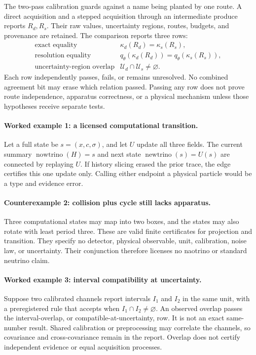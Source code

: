 The two-pass calibration guards against a name being planted by one route.  A direct acquisition and a stepped
acquisition through an intermediate produce reports \(R_d,R_s\).  Their raw values, uncertainty regions, routes,
budgets, and provenance are retained.  The comparison reports three rows:
\[
\begin{array}{ll}
\text{exact equality}&\kappa_d(R_d)=\kappa_s(R_s),\\
\text{resolution equality}&q_\theta(\kappa_d(R_d))=q_\theta(\kappa_s(R_s)),\\
\text{uncertainty-region overlap}&\mathcal U_d\cap\mathcal U_s\ne\varnothing.
\end{array}
\]
Each row independently passes, fails, or remains unresolved.  No combined agreement bit may erase which relation
passed.  Passing any row does not prove route independence, apparatus correctness, or a physical mechanism unless
those hypotheses receive separate tests.

\paragraph{Worked example 1: a licensed computational transition.}
Let a full state be \(s=(x,c,\sigma)\), and let \(U\) update all three fields.  The current summary
\(\operatorname{nowtrino}(H)=s\) and next state \(\operatorname{newtrino}(s)=U(s)\) are connected by replaying \(U\).
If history slicing erased the prior trace, the edge certifies this one update only.  Calling either endpoint a
physical particle would be a type and evidence error.

\paragraph{Counterexample 2: collision plus cycle still lacks apparatus.}
Three computational states may map into two boxes, and the states may also rotate with least period three.  These are
valid finite certificates for projection and transition.  They specify no detector, physical observable, unit,
calibration, noise law, or uncertainty.  Their conjunction therefore licenses no naotrino or standard neutrino claim.

\paragraph{Worked example 3: interval compatibility at uncertainty.}
Suppose two calibrated channels report intervals \(I_1\) and \(I_2\) in the same unit, with a preregistered rule that
accepts when \(I_1\cap I_2\ne\varnothing\).  An observed overlap passes the interval-overlap, or
compatible-at-uncertainty, row.  It is not an exact same-number result.  Shared
calibration or preprocessing may correlate the channels, so covariance and cross-covariance remain in the report.
Overlap does not certify independent evidence or equal acquisition processes.

